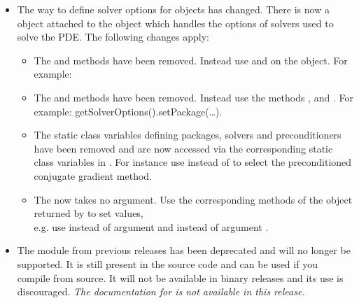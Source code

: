 \begin{itemize}
\item The way to define solver options for \LinearPDE objects has changed.
    There is now a \SolverOptions object attached to the \LinearPDE
    object which handles the options of solvers used to solve the PDE.
    The following changes apply:  
 \begin{itemize}
  \item The  and  methods
      have been removed. Instead use  and
       on the \SolverOptions object. For example:
  \item The  and  methods have
      been removed. Instead use the methods ,
       and . For example:
      getSolverOptions().setPackage(\ldots).
  \item The static class variables defining packages, solvers and
      preconditioners have been removed and are now accessed via the
      corresponding static class variables in \SolverOptions.
      For instance use  instead of
       to select the preconditioned conjugate gradient
      method.
  \item The  now takes no argument. Use the corresponding
      methods of the \SolverOptions object returned by
       to set values,\\ e.g. use
       instead of argument
       and 
      instead of argument .
 \end{itemize}

\item The \pyvisi module from previous releases has been deprecated and will no
    longer be supported. It is still present in the source code and can be used
    if you compile \escript from source. It will not be available in binary
    releases and its use is discouraged.
    \emph{The documentation for \pyvisi is not available in this release.}
\end{itemize}

